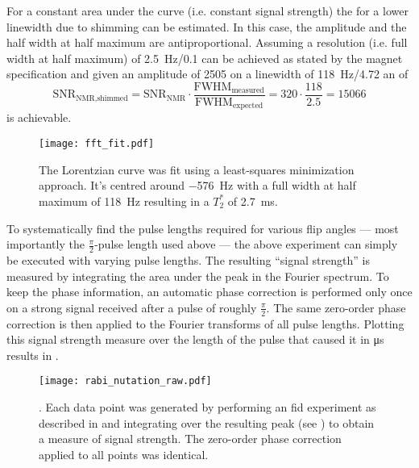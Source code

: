 For a constant area under the curve (i.e. constant signal strength) the \snrnmr{} for a lower linewidth due to shimming can be estimated. In this case, the amplitude and the half width at half maximum are antiproportional. Assuming a resolution (i.e. full width at half maximum) of \qty{2.5}{\hertz}/\qty{0.1}{\partspermillion} can be achieved as stated by the magnet specification and given an amplitude of 2505 on a linewidth of \qty{118}{\hertz}/\qty{4.72}{\partspermillion} an \snrnmr{} of
\[
    \text{SNR}_{\text{NMR,shimmed}} = \text{SNR}_{\text{NMR}} \cdot \frac{\text{FWHM}_{\text{measured}}}{\text{FWHM}_{\text{expected}}} = 320 \cdot \frac{118}{2.5} = \num{15066}
\]
is achievable.

\begin{figure}[h!bt]
    \centering
    \texttt{[image: fft\_fit.pdf]}
    \caption{ The Lorentzian curve was fit using a least-squares minimization approach. It's centred around \qty{-576}{\hertz} with a full width at half maximum of \qty{118}{\hertz} resulting in a \(T_2^*\) of \qty{2.7}{\milli\second}.}
\end{figure}

To systematically find the pulse lengths required for various flip angles --- most importantly the \(\frac{\pi}{2}\)-pulse length used above --- the above experiment can simply be executed with varying pulse lengths. The resulting \enquote{signal strength} is measured by integrating the area under the peak in the Fourier spectrum. To keep the phase information, an automatic phase correction is performed only once on a strong signal received after a pulse of roughly \(\frac{\pi}{2}\). The same zero-order phase correction is then applied to the Fourier transforms of all pulse lengths. Plotting this signal strength measure over the length of the pulse that caused it in \unit{\micro\second} results in .

\begin{figure}[h!bt]
    \centering
    \texttt{[image: rabi\_nutation\_raw.pdf]}
    \caption{. Each data point was generated by performing an \acrshort{fid} experiment as described in  and integrating over the resulting peak (see ) to obtain a measure of signal strength. The zero-order phase correction applied to all points was identical.}
\end{figure}

